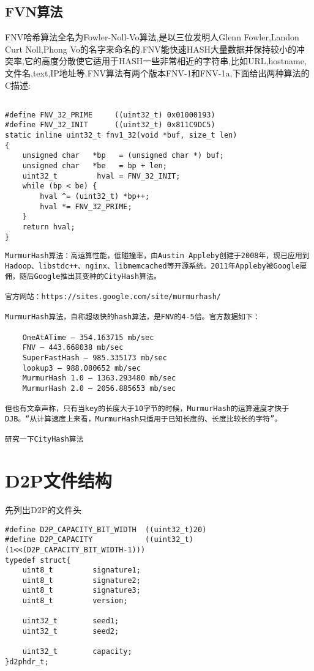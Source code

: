 \subsection{FVN算法}


FNV哈希算法全名为Fowler-Noll-Vo算法,是以三位发明人Glenn Fowler,Landon Curt Noll,Phong Vo的名字来命名的.FNV能快速HASH大量数据并保持较小的冲突率,它的高度分散使它适用于HASH一些非常相近的字符串,比如URL,hostname,文件名,text,IP地址等.FNV算法有两个版本FNV-1和FNV-1a,下面给出两种算法的C描述:

\begin{lstlisting}

#define FNV_32_PRIME     ((uint32_t) 0x01000193)
#define FNV_32_INIT      ((uint32_t) 0x811C9DC5)
static inline uint32_t fnv1_32(void *buf, size_t len)  
{
    unsigned char   *bp   = (unsigned char *) buf;
    unsigned char   *be   = bp + len;
    uint32_t         hval = FNV_32_INIT;
    while (bp < be) {
        hval ^= (uint32_t) *bp++;  
        hval *= FNV_32_PRIME;
    }
    return hval;
}
\end{lstlisting}


\begin{lstlisting}
MurmurHash算法：高运算性能，低碰撞率，由Austin Appleby创建于2008年，现已应用到Hadoop、libstdc++、nginx、libmemcached等开源系统。2011年Appleby被Google雇佣，随后Google推出其变种的CityHash算法。

官方网站：https://sites.google.com/site/murmurhash/

MurmurHash算法，自称超级快的hash算法，是FNV的4-5倍。官方数据如下：

    OneAtATime – 354.163715 mb/sec
    FNV – 443.668038 mb/sec
    SuperFastHash – 985.335173 mb/sec
    lookup3 – 988.080652 mb/sec
    MurmurHash 1.0 – 1363.293480 mb/sec
    MurmurHash 2.0 – 2056.885653 mb/sec

但也有文章声称，只有当key的长度大于10字节的时候，MurmurHash的运算速度才快于DJB。“从计算速度上来看，MurmurHash只适用于已知长度的、长度比较长的字符”。

研究一下CityHash算法

\end{lstlisting}

\section{D2P文件结构}
先列出D2P的文件头
\begin{lstlisting}
#define D2P_CAPACITY_BIT_WIDTH  ((uint32_t)20)
#define D2P_CAPACITY            ((uint32_t)(1<<(D2P_CAPACITY_BIT_WIDTH-1)))
typedef struct{
    uint8_t         signature1;
    uint8_t         signature2;
    uint8_t         signature3;
    uint8_t         version;

    uint32_t        seed1;
    uint32_t        seed2;

    uint32_t        capacity;
}d2phdr_t;
\end{lstlisting}


